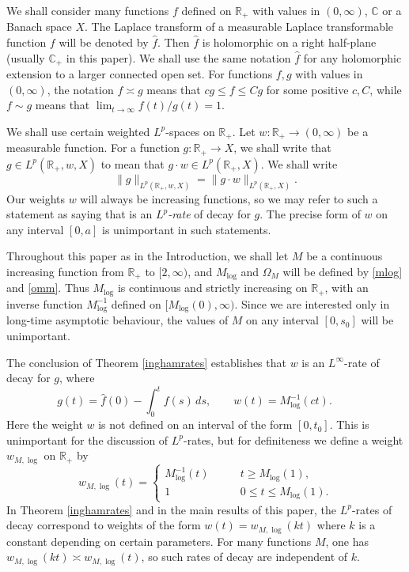 \documentclass[11pt]{amsart}
\theoremstyle{definition}
\theoremstyle{remark}
\numberwithin{equation}{section}
\begin{document}
We shall consider many functions $f$ defined on ${{\mathbb R}}_+$ with values in $(0,\infty)$, ${{\mathbb C}}$ or a Banach space $X$.  The Laplace transform of a measurable Laplace transformable function $f$ will be denoted by $\widehat f$.  Then $\widehat f$ is holomorphic on a right half-plane (usually ${{\mathbb C}}_+$ in this paper).  We shall use the same notation $\widehat f$ for any holomorphic extension to a larger connected open set.  For functions $f,g$ with values in $(0,\infty)$, the notation $f \asymp g$ means that $c g \le f \le C g$ for some positive $c,C$, while $f \sim g$ means that $\lim_{t\to\infty} f(t)/g(t) = 1$.

We shall use certain weighted $L^p$-spaces on ${{\mathbb R}}_+$.  Let $w : {{\mathbb R}}_+ \to (0,\infty)$ be a measurable function.  For a function $g : {{\mathbb R}}_+ \to X$, we shall write that $g \in L^p({{\mathbb R}}_+,w,X)$ to mean that $g \cdot w \in L^p({{\mathbb R}}_+,X)$.  We shall write
$$
\|g\|_{L^p({{\mathbb R}}_+,w,X)} = \|g \cdot w\|_{L^p({{\mathbb R}}_+,X)}.
$$
Our weights $w$ will always be increasing functions, so we may refer to such a statement as saying that is an {\it $L^p$-rate} of decay for $g$.  The precise form of $w$ on any interval $[0,a]$ is unimportant in such statements.

 Throughout this paper as in the Introduction, we shall let $M$ be a continuous increasing function from ${{\mathbb R}}_+$ to $[2,\infty)$, and $M_{\log}$ and $\Omega_M$ will be defined by  \eqref{mlog} and \eqref{omm}.  Thus $M_{\log}$ is continuous and strictly increasing on ${{\mathbb R}}_+$, with an inverse function $M_{\log}^{-1}$ defined on $[M_{\log}(0), \infty)$.   Since we are interested only in long-time asymptotic behaviour, the values of $M$ on any interval $[0,s_0]$ will be unimportant.

The conclusion of Theorem \ref{inghamrates} establishes that $w$ is an $L^\infty$-rate of decay for $g$, where
$$
 g(t) = \widehat f(0) - \int_0^t f(s) \, ds, \qquad  w(t) = M_{\log}^{-1}(ct). \qquad
$$
Here the weight $w$ is not defined on an interval of the form $[0,t_0]$.  This is unimportant for the discussion of $L^p$-rates, but for definiteness we define a weight ${w_{M,{\log}}}$ on ${{\mathbb R}}_+$ by
$$
w_{M,\log}(t) = \begin{cases}  M_{\log}^{-1}(t)  \qquad &t \ge M_{\log}(1), \\
1 &0\le t\le M_{\log}(1).  \end{cases}
$$
In Theorem \ref{inghamrates} and in the main results of this paper, the $L^p$-rates of decay correspond to weights of the form $w(t)= {w_{M,{\log}}}(kt)$ where $k$ is a constant depending on certain parameters.  For many functions $M$, one has ${w_{M,{\log}}}(kt) \asymp {w_{M,{\log}}}(t)$, so such rates of decay are independent of $k$.
\end{document}
